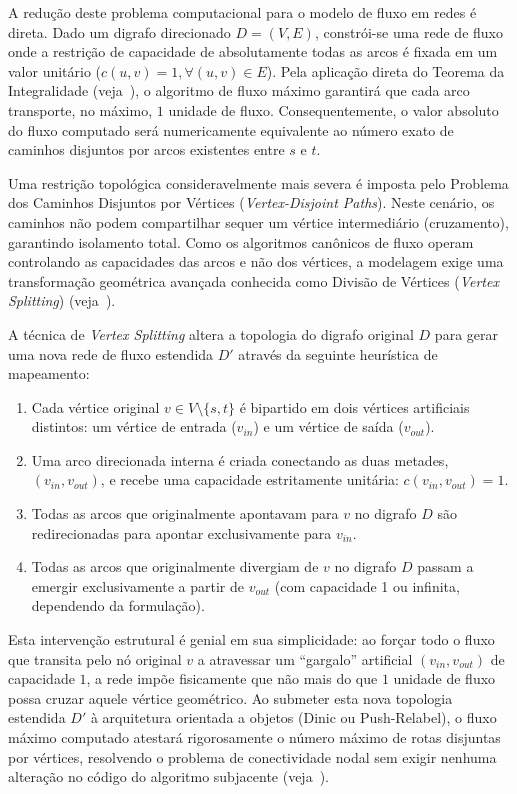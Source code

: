 \documentclass[12pt,a4paper]{article}
\begin{document}
A redução deste problema computacional para o modelo de fluxo em redes é direta. Dado um digrafo direcionado $D = (V, E)$, constrói-se uma rede de fluxo onde a restrição de capacidade de absolutamente todas as arcos é fixada em um valor unitário ($c(u,v) = 1, \forall (u,v) \in E$). Pela aplicação direta do Teorema da Integralidade (veja~\cite{cook1998combinatorial}), o algoritmo de fluxo máximo garantirá que cada arco transporte, no máximo, $1$ unidade de fluxo. Consequentemente, o valor absoluto do fluxo computado será numericamente equivalente ao número exato de caminhos disjuntos por arcos existentes entre $s$ e $t$.

Uma restrição topológica consideravelmente mais severa é imposta pelo Problema dos Caminhos Disjuntos por Vértices (\textit{Vertex-Disjoint Paths}). Neste cenário, os caminhos não podem compartilhar sequer um vértice intermediário (cruzamento), garantindo isolamento total. Como os algoritmos canônicos de fluxo operam controlando as capacidades das arcos e não dos vértices, a modelagem exige uma transformação geométrica avançada conhecida como Divisão de Vértices (\textit{Vertex Splitting}) (veja~\cite{ahuja1993network}).

A técnica de \textit{Vertex Splitting} altera a topologia do digrafo original $D$ para gerar uma nova rede de fluxo estendida $D'$ através da seguinte heurística de mapeamento:
\begin{enumerate}
    \item Cada vértice original $v \in V \setminus \{s, t\}$ é bipartido em dois vértices artificiais distintos: um vértice de entrada ($v_{in}$) e um vértice de saída ($v_{out}$).
    \item Uma arco direcionada interna é criada conectando as duas metades, $(v_{in}, v_{out})$, e recebe uma capacidade estritamente unitária: $c(v_{in}, v_{out}) = 1$.
    \item Todas as arcos que originalmente apontavam para $v$ no digrafo $D$ são redirecionadas para apontar exclusivamente para $v_{in}$.
    \item Todas as arcos que originalmente divergiam de $v$ no digrafo $D$ passam a emergir exclusivamente a partir de $v_{out}$ (com capacidade 1 ou infinita, dependendo da formulação).
\end{enumerate}

Esta intervenção estrutural é genial em sua simplicidade: ao forçar todo o fluxo que transita pelo nó original $v$ a atravessar um ``gargalo'' artificial $(v_{in}, v_{out})$ de capacidade $1$, a rede impõe fisicamente que não mais do que $1$ unidade de fluxo possa cruzar aquele vértice geométrico. Ao submeter esta nova topologia estendida $D'$ à arquitetura orientada a objetos (Dinic ou Push-Relabel), o fluxo máximo computado atestará rigorosamente o número máximo de rotas disjuntas por vértices, resolvendo o problema de conectividade nodal sem exigir nenhuma alteração no código do algoritmo subjacente (veja~\cite{korte2018combinatorial}).
\end{document}
